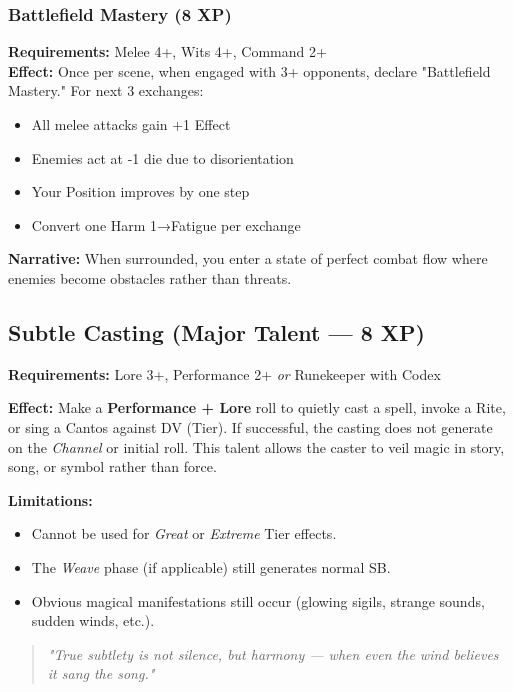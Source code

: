 \subsubsection{Battlefield Mastery (8 XP)}
\textbf{Requirements:} Melee 4+, Wits 4+, Command 2+ \\
\textbf{Effect:} Once per scene, when engaged with 3+ opponents, declare "Battlefield Mastery." For next 3 exchanges:
\begin{itemize}
    \item All melee attacks gain +1 Effect
    \item Enemies act at -1 die due to disorientation
    \item Your Position improves by one step
    \item Convert one Harm 1→Fatigue per exchange
\end{itemize}
\textbf{Narrative:} When surrounded, you enter a state of perfect combat flow where enemies become obstacles rather than threats.

\subsection*{Subtle Casting (Major Talent --- 8 XP)}

\textbf{Requirements:} Lore 3+, Performance 2+ \emph{or} Runekeeper with Codex

\textbf{Effect:} Make a \textbf{Performance + Lore} roll to quietly cast a spell, invoke a Rite, or sing a Cantos against DV (Tier). 
If successful, the casting does not generate  on the \emph{Channel} or initial roll. 
This talent allows the caster to veil magic in story, song, or symbol rather than force.

\textbf{Limitations:}
\begin{itemize}
  \item Cannot be used for \emph{Great} or \emph{Extreme} Tier effects.
  \item The \emph{Weave} phase (if applicable) still generates normal SB.
  \item Obvious magical manifestations still occur (glowing sigils, strange sounds, sudden winds, etc.).
\end{itemize}

\begin{quote}
\emph{"True subtlety is not silence, but harmony --- when even the wind believes it sang the song."}
\end{quote}

